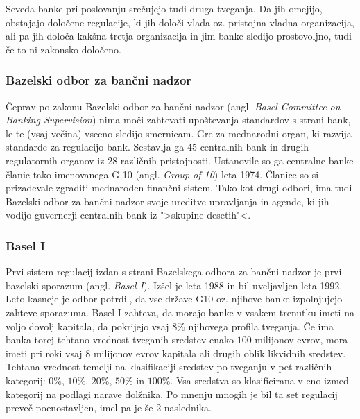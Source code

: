 \documentclass[12pt,a4paper]{amsart}
\theoremstyle{definition} %
\theoremstyle{plain} %
\begin{document}
Seveda banke pri poslovanju srečujejo tudi druga tveganja. Da jih omejijo, 
obstajajo določene regulacije, ki jih določi vlada oz. pristojna vladna organizacija, 
ali pa jih določa kakšna tretja organizacija in jim banke sledijo prostovoljno, tudi 
če to ni zakonsko določeno. 

\subsubsection{Bazelski odbor za bančni nadzor}
Čeprav po zakonu Bazelski odbor za bančni nadzor (angl. \textit{Basel Committee 
on Banking Supervision}) nima moči zahtevati upoštevanja standardov s strani bank, 
le-te (vsaj večina) vseeno sledijo smernicam. Gre za mednarodni organ, ki razvija 
standarde za regulacijo bank. Sestavlja ga 45 centralnih bank in drugih regulatornih
organov iz 28 različnih pristojnosti. Ustanovile so ga centralne banke članic tako 
imenovanega G-10 (angl. \textit{Group of 10}) leta 1974. Članice so si prizadevale
zgraditi mednaroden finančni sistem. Tako kot drugi odbori, ima tudi Bazelski odbor 
za bančni nadzor svoje ureditve upravljanja in agende, ki jih vodijo guvernerji 
centralnih bank iz ">skupine desetih"<.

\subsubsection{Basel I}
Prvi sistem regulacij izdan s strani Bazelskega odbora za bančni nadzor je prvi
bazelski sporazum (angl. \textit{Basel I}). Izšel je leta 1988 in bil uveljavljen 
leta 1992. Leto kasneje je odbor potrdil, da vse države G10 oz. njihove banke 
izpolnjujejo zahteve sporazuma. Basel I zahteva, da morajo banke v vsakem 
trenutku imeti na voljo dovolj kapitala, da pokrijejo vsaj $8\%$ njihovega profila
tveganja. Če ima banka torej tehtano vrednost tveganih sredstev enako $100$ milijonov
evrov, mora imeti pri roki vsaj $8$ milijonov evrov kapitala ali drugih oblik likvidnih sredstev. Tehtana vrednost 
temelji na klasifikaciji sredstev po tveganju  v pet različnih kategorij: $0\%$, $10\%$, $20\%$, 
$50\%$ in $100\%$. Vsa sredstva so klasificirana v eno izmed kategorij na 
podlagi narave dolžnika. Po mnenju mnogih je bil ta set regulacij preveč 
poenostavljen, imel pa je še 2 naslednika.
\end{document}
